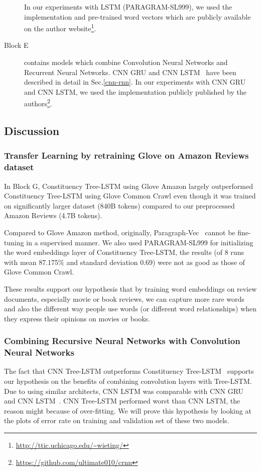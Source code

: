\begin{description}
	In our experiments with LSTM (PARAGRAM-SL999), we used the implementation and pre-trained word vectors which are publicly available on the author website\footnote{\url{http://ttic.uchicago.edu/~wieting/}}.
	\item[Block E] contains models which combine Convolution Neural Networks and Recurrent Neural Networks.
	CNN GRU and CNN LSTM~\cite{cnn-rnn} have been described in detail in Sec.\ref{cnn-rnn}.
	In our experiments with CNN GRU and CNN LSTM, we used the implementation publicly published by the authors\footnote{\url{https://github.com/ultimate010/crnn}}.
\end{description}
\subsection{Discussion}
\subsubsection{Transfer Learning by retraining Glove on Amazon Reviews dataset}
\label{fact:glove-amazon-improve-tree}
In Block G, Constituency Tree-LSTM using Glove Amazon largely outperformed Constituency Tree-LSTM using Glove Common Crawl even though it was trained on significantly larger dataset (840B tokens) compared to our preprocessed Amazon Reviews (4.7B tokens).

Compared to Glove Amazon method, originally,  Paragraph-Vec~\cite{ParagraphVec} cannot be fine-tuning in a supervised manner.
We also used PARAGRAM-SL999 for initializing the word embeddings layer of Constituency Tree-LSTM,
the results (of 8 runs with mean 87.175\% and standard deviation 0.69) were not as good as those of Glove Common Crawl.

These results support our hypothesis that by training word embeddings on review documents, especially movie or book reviews, we can capture more rare words and also the different way people use words (or different word relationships) when they express their opinions on movies or books.

\subsubsection{Combining Recursive Neural Networks with Convolution Neural Networks}
\label{proved:tree-conv-benefit}
The fact that CNN Tree-LSTM outperforms Constituency Tree-LSTM~\cite{treeLSTM} supports our hypothesis on the benefits of combining convolution layers with Tree-LSTM.
Due to using similar architects, CNN LSTM was comparable with CNN GRU and CNN LSTM~\cite{cnn-rnn}. \label{unproved:cnn-treelstm-overfit}
CNN Tree-LSTM performed worst than CNN LSTM, the reason might because of over-fitting.
We will prove this hypothesis by looking at the plots of error rate on training and validation set of these two models.

